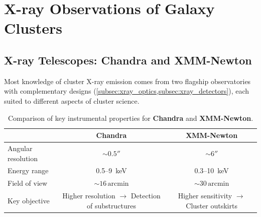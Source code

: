 \vspace{-2em}

\section{X-ray Observations of Galaxy Clusters} \label{sec:icm_xray_obs}

\subsection{X-ray Telescopes: Chandra and XMM-Newton} \label{subsec:icm_telescopes}

Most knowledge of cluster X-ray emission comes from two flagship observatories with complementary designs (\cref{subsec:xray_optics,subsec:xray_detectors}), each suited to different aspects of cluster science.


\begin{table}[H]
    \centering
    \begin{tabular}{@{}lcc@{}}
        \toprule
        & \textbf{Chandra} & \textbf{XMM-Newton} \\
        \midrule
        Angular resolution & $\sim 0.5''$ & $\sim 6''$ \\
        Energy range      & 0.5--9~keV & 0.3--10~keV \\
        Field of view     & $\sim 16\,\text{arcmin}$ & $\sim 30\,\text{arcmin}$ \\
        Key objective
            & \makecell{Higher resolution \\ $\rightarrow$ Detection of substructures}
            & \makecell{Higher sensitivity \\ $\rightarrow$ Cluster outskirts} \\
        \bottomrule
    \end{tabular}
    \caption{Comparison of key instrumental properties for \textbf{Chandra} and \textbf{XMM-Newton}.}
\end{table}



